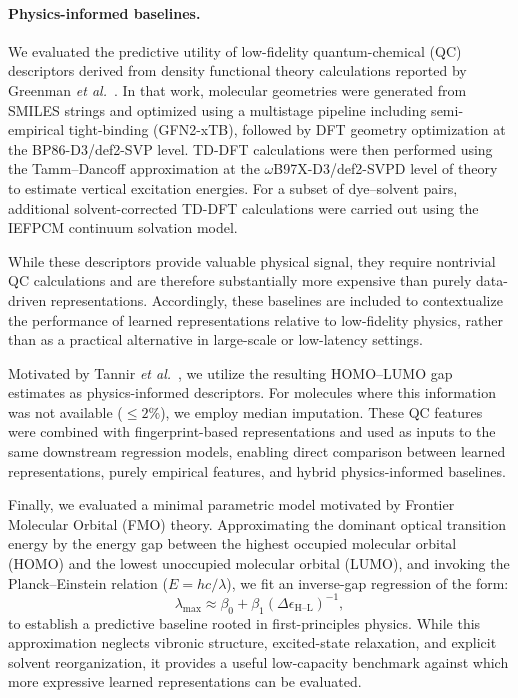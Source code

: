 \paragraph{Physics-informed baselines.}
We evaluated the predictive utility of low-fidelity quantum-chemical (QC) descriptors derived from density functional theory calculations reported by Greenman \textit{et al.}~\cite{greenman2022multi}. In that work, molecular geometries were generated from SMILES strings and optimized using a multistage pipeline including semi-empirical tight-binding (GFN2-xTB), followed by DFT geometry optimization at the BP86-D3/def2-SVP level. TD-DFT calculations were then performed using the Tamm--Dancoff approximation at the $\omega$B97X-D3/def2-SVPD level of theory to estimate vertical excitation energies. For a subset of dye--solvent pairs, additional solvent-corrected TD-DFT calculations were carried out using the IEFPCM continuum solvation model. 

While these descriptors provide valuable physical signal, they require nontrivial QC calculations and are therefore substantially more expensive than purely data-driven representations. Accordingly, these baselines are included to contextualize the performance of learned representations relative to low-fidelity physics, rather than as a practical alternative in large-scale or low-latency settings.

Motivated by Tannir \textit{et al.}~\cite{tannir2024predicting}, we utilize the resulting HOMO--LUMO gap estimates as physics-informed descriptors. For molecules where this information was not available ($\leq 2\%$), we employ median imputation. These QC features were combined with fingerprint-based representations and used as inputs to the same downstream regression models, enabling direct comparison between learned representations, purely empirical features, and hybrid physics-informed baselines.

Finally, we evaluated a minimal parametric model motivated by Frontier Molecular Orbital (FMO) theory. Approximating the dominant optical transition energy by the energy gap between the highest occupied molecular orbital (HOMO) and the lowest unoccupied molecular orbital (LUMO), and invoking the Planck--Einstein relation ($E = hc/\lambda$), we fit an inverse-gap regression of the form:
\begin{equation}
\lambda_{\max} \approx \beta_0 + \beta_1 (\Delta \epsilon_{\text{H--L}})^{-1},
\end{equation}
to establish a predictive baseline rooted in first-principles physics. While this approximation neglects vibronic structure, excited-state relaxation, and explicit solvent reorganization, it provides a useful low-capacity benchmark against which more expressive learned representations can be evaluated.


